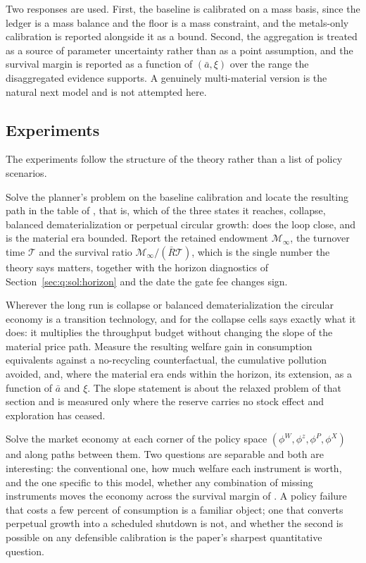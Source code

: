 Two responses are used. First, the baseline is calibrated on a mass basis, since the ledger is a mass balance and the floor is a mass constraint, and the metals-only calibration is reported alongside it as a bound. Second, the aggregation is treated as a source of parameter uncertainty rather than as a point assumption, and the survival margin is reported as a function of $\left(\bar a,\xi\right)$ over the range the disaggregated evidence supports. A genuinely multi-material version is the natural next model and is not attempted here.

\subsection{Experiments}\label{sec:q:cal:experiments}

The experiments follow the structure of the theory rather than a list of policy scenarios.

 Solve the planner's problem on the baseline calibration and locate the resulting path in the table of , that is, which of the three states it reaches, collapse, balanced dematerialization or perpetual circular growth: does the loop close, and is the material era bounded. Report the retained endowment $\mathcal M_\infty$, the turnover time $\mathcal T$ and the survival ratio $\mathcal M_\infty/\left(\bar R\mathcal T\right)$, which is the single number the theory says matters, together with the horizon diagnostics of Section~\ref{sec:q:sol:horizon} and the date the gate fee changes sign.

 Wherever the long run is collapse or balanced dematerialization the circular economy is a transition technology, and for the collapse cells  says exactly what it does: it multiplies the throughput budget without changing the slope of the material price path. Measure the resulting welfare gain in consumption equivalents against a no-recycling counterfactual, the cumulative pollution avoided, and, where the material era ends within the horizon, its extension, as a function of $\bar a$ and $\xi$. The slope statement is about the relaxed problem of that section and is measured only where the reserve carries no stock effect and exploration has ceased.

 Solve the market economy at each corner of the policy space $\left(\phi^W,\phi^z,\phi^P,\phi^X\right)$ and along paths between them. Two questions are separable and both are interesting: the conventional one, how much welfare each instrument is worth, and the one specific to this model, whether any combination of missing instruments moves the economy across the survival margin of . A policy failure that costs a few percent of consumption is a familiar object; one that converts perpetual growth into a scheduled shutdown is not, and whether the second is possible on any defensible calibration is the paper's sharpest quantitative question.

